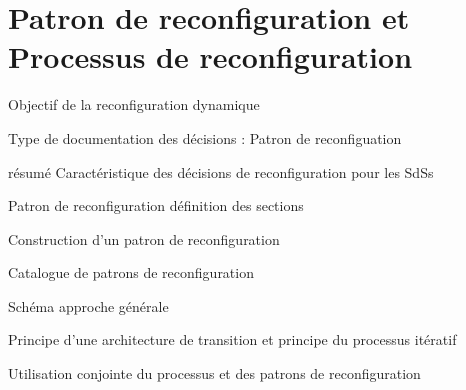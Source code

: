 \section{Patron de reconfiguration et Processus de reconfiguration}

\begin{frame}{Objectif de la reconfiguration dynamique}
\end{frame}



\begin{frame}{Type de documentation des décisions : Patron de
reconfiguation}
\end{frame}

\begin{frame}{ résumé Caractéristique des décisions de reconfiguration
pour les SdSs}
\end{frame}


\begin{frame}{Patron de reconfiguration}
    définition des sections
\end{frame}

\begin{frame}{Construction d'un patron de reconfiguration}
\end{frame}

\begin{frame}{Catalogue de patrons de reconfiguration}
\end{frame}

\begin{frame}{Schéma approche générale}
    
\end{frame}

\begin{frame}{Principe d'une architecture de transition et principe du processus itératif}
\end{frame}

\begin{frame}{Utilisation conjointe du processus et des patrons de reconfiguration}
\end{frame}
